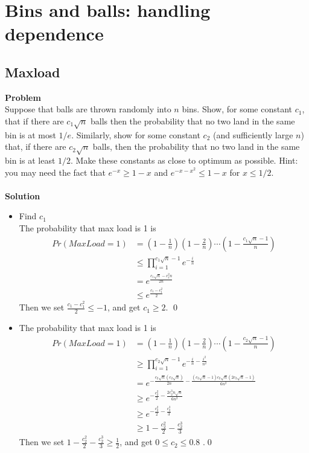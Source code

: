 \chapter{Bins and balls: handling dependence}
	
	\section{Maxload}
	\textbf{Problem}\\
	Suppose that balls are thrown randomly into $n$ bins. Show, for some constant $c_1$, that
	if there are $c_1\sqrt{n}$ balls then the probability that no two land in the same bin is at most
	$1/e$. Similarly, show for some constant $c_2$ (and sufficiently large $n$) that, if there are $c_2\sqrt{n}$
	balls, then the probability that no two land in the same bin is at least $1/2$. Make these
	constants as close to optimum as possible. Hint: you may need the fact that $e^{-x} \ge 1-x$
	and $e^{-x-x^2} \le 1-x$ for $x \le 1/2$.\\\\
	\textbf{Solution}\\
	\begin{itemize}  
		\item 
			Find $c_1$\\
			The probability that max load is 1 is
			\begin{equation*}
				\begin{split} 
					Pr(MaxLoad=1) &= (1-\frac{1}{n})(1-\frac{2}{n})\cdots (1-\frac{c_1\sqrt{n}-1}{n}) \\
					&\le \prod_{i=1}^{c_1\sqrt{n}-1} e^{-\frac{i}{n}} \\
					&= e^{\frac{c_1\sqrt{n}-c_1^2n}{2n}} \\
					&\le e^{\frac{c_1-c_1^2}{2}}
				\end{split}
			\end{equation*}
			Then we set $\frac{c_1-c_1^2}{2} \le -1$, and get $c_1 \ge 2$. \qed
			
		\item 
			The probability that max load is 1 is
			\begin{equation*}
				\begin{split}
					Pr(MaxLoad=1) &= (1-\frac{1}{n})(1-\frac{2}{n})\cdots (1-\frac{c_2\sqrt{n}-1}{n}) \\
					&\ge \prod_{i=1}^{c_2\sqrt{n}-1} e^{-\frac{i}{n}-\frac{i^2}{n^2}} \\
					&= e^{ -\frac{c_2\sqrt{n}(c_2\sqrt{n})}{2n} -\frac{(c_2\sqrt{n}-1)c_2\sqrt{n}(2c_2\sqrt{n}-1)}{6n^2}} \\
					&\ge e^{ -\frac{c_2^2}{2} -\frac{2c_2^3n\sqrt{n}}{6n^2} } \\
					&\ge e^{ -\frac{c_2^2}{2} -\frac{c_2^3}{3} } \\
					&\ge 1 -\frac{c_2^2}{2} -\frac{c_2^3}{3}
				\end{split}
			\end{equation*}
			Then we set $1 -\frac{c_2^2}{2} -\frac{c_2^3}{3} \ge \frac{1}{2}$, and get $0 \le c_2 \le 0.8$ .\qed
	\end{itemize}
	

